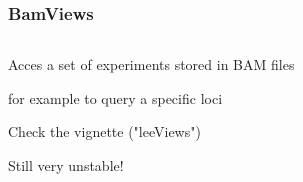 \documentclass{beamer}
\begin{document}

\begin{frame}
\frametitle{BamViews}
\begin{column}{1\textwidth}
  \bit
      \item Acces a set of experiments stored in BAM files
        \bit
            \item for example to query a specific loci
        \eit 
      \item Check the vignette ("leeViews")
      \item Still very unstable!
  \eit
  \end{column}
  
\end{frame}

\end{document}
